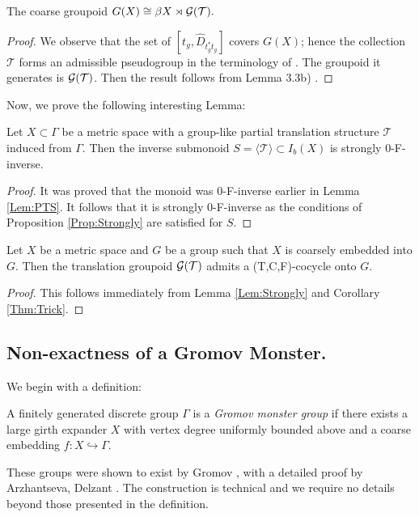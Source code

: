 \begin{example}
\begin{lemma}\label{Lem:CG}
The coarse groupoid $G(X) \cong \beta X \rtimes \mathcal{G}(\mathcal{T}).$
\end{lemma}
\begin{proof}
We observe that the set of $[t_{g},\widehat{D}_{t_{g}^{*}t_{g}}]$ covers $G(X)$; hence the collection $\mathcal{T}$ forms an admissible pseudogroup in the terminology of \cite{MR1905840}. The groupoid it generates is $\mathcal{G}(\mathcal{T})$. Then the result follows from Lemma 3.3b) \cite{MR1905840}.
\end{proof}

Now, we prove the following interesting Lemma:

\begin{lemma}\label{Lem:Strongly}
Let $X \subset \Gamma$ be a metric space with a group-like partial translation structure $\mathcal{T}$ induced from $\Gamma$. Then the inverse submonoid $S=\langle \mathcal{T} \rangle \subset I_{b}(X)$ is strongly $0$-F-inverse.
\end{lemma}
\begin{proof}
It was proved that the monoid was $0$-F-inverse earlier in Lemma \ref{Lem:PTS}. It follows that it is strongly $0$-F-inverse as the conditions of Proposition \ref{Prop:Strongly} are satisfied for $S$.
\end{proof}

\begin{corollary}\label{Prop:Cocycle}
Let $X$ be a metric space and $G$ be a group such that $X$ is coarsely embedded into $G$. Then the translation groupoid $\mathcal{G}(\mathcal{T})$ admits a (T,C,F)-cocycle onto $G$.
\end{corollary}
\begin{proof}
This follows immediately from Lemma \ref{Lem:Strongly} and Corollary \ref{Thm:Trick}.
\end{proof}

\subsection{Non-exactness of a Gromov Monster.}
We begin with a definition:
\begin{definition}
A finitely generated discrete group $\Gamma$ is a \textit{Gromov monster group} if there exists a large girth expander $X$ with vertex degree uniformly bounded above and a coarse embedding $f: X \hookrightarrow \Gamma$. 
\end{definition}

These groups were shown to exist by Gromov \cite{MR1978492}, with a detailed proof by Arzhantseva, Delzant \cite{exrangrps}. The construction is technical and we require no details beyond those presented in the definition.


\end{example}

